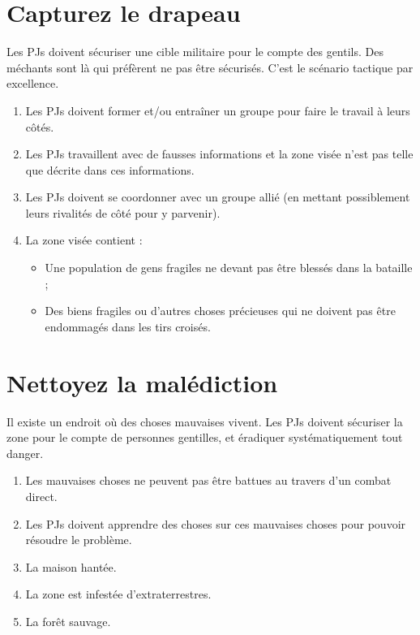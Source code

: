 \begin{multicols}{2}
\section{Capturez le drapeau}
\hypertarget{drapeau}{}


Les PJs doivent sécuriser une cible militaire pour le compte des gentils. Des méchants sont là qui préfèrent ne pas être sécurisés. C'est le scénario tactique par excellence.

\themes
\begin{enumerate}
\item Les PJs doivent former et/ou entraîner un groupe pour faire le travail à leurs côtés.
\item Les PJs travaillent avec de fausses informations et la zone visée n'est pas telle que décrite dans ces informations.
\item Les PJs doivent se coordonner avec un groupe allié (en mettant possiblement leurs rivalités de côté pour y parvenir).
\item La zone visée contient :
\begin{itemize}
\item Une population de gens fragiles ne devant pas être blessés dans la bataille ;
\item Des biens fragiles ou d'autres choses précieuses qui ne doivent pas être endommagés dans les tirs croisés.
\end{itemize}
\end{enumerate}

\section{Nettoyez la malédiction}
\hypertarget{malediction}{}


Il existe un endroit où des choses mauvaises vivent. Les PJs doivent sécuriser la zone pour le compte de personnes gentilles, et éradiquer systématiquement tout danger.

\themes
\begin{enumerate}
\item Les mauvaises choses ne peuvent pas être battues au travers d'un combat direct.
\item Les PJs doivent apprendre des choses sur ces mauvaises choses pour pouvoir résoudre le problème.
\item La maison hantée.
\item La zone est infestée d'extraterrestres.
\item La forêt sauvage.
\end{enumerate}


\end{multicols}
